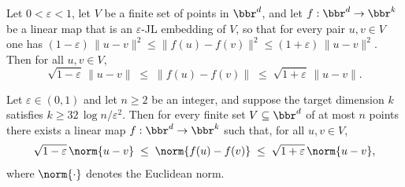 \begin{lemma}
\label{jl_dist_of_embedding}
\leanok
{}
Let $0 < \varepsilon < 1$, let $V$ be a finite set of points in $\bbr^d$, and let $f :
\bbr^d \to \bbr^k$ be a linear map that is an $\varepsilon$-JL embedding of $V$, so that
for every pair $u, v \in V$ one has $(1-\varepsilon)\,\|u-v\|^2 \le \|f(u)-f(v)\|^2 \le
(1+\varepsilon)\,\|u-v\|^2$. Then for all $u, v \in V$,
\[
\sqrt{1-\varepsilon}\,\|u - v\| \;\le\; \|f(u) - f(v)\| \;\le\;
\sqrt{1+\varepsilon}\,\|u - v\|.
\]
\end{lemma}

\begin{theorem}
\label{johnson_lindenstrauss_dist}
\leanok
{}
Let $\varepsilon \in (0,1)$ and let $n \ge 2$ be an integer, and suppose the target
dimension $k$ satisfies $k \ge 32\,\log n / \varepsilon^2$. Then for every finite set $V
\subseteq \bbr^d$ of at most $n$ points there exists a linear map $f : \bbr^d \to
\bbr^k$ such that, for all $u, v \in V$,
\[
\sqrt{1-\varepsilon}\,\norm{u - v} \;\le\; \norm{f(u) - f(v)} \;\le\;
\sqrt{1+\varepsilon}\,\norm{u - v},
\]
where $\norm{\cdot}$ denotes the Euclidean norm.
\end{theorem}

